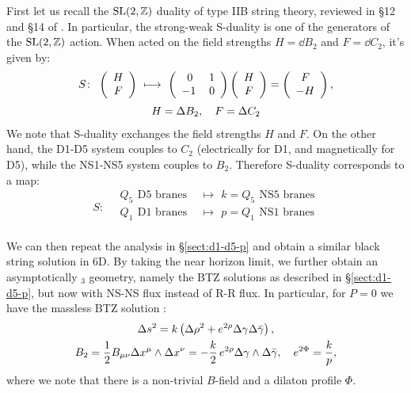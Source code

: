 \documentclass[11pt,a4paper]{article}
\newcommand{\ads}[1]{\text{AdS}\ensuremath{_{#1}}}
\begin{document}
	First let us recall the $\mathrm{SL}(2,\mathbb{Z})$ duality of type IIB string theory, reviewed in \S12 and \S14 of \cite{Polchinski:1998rr}. In particular, the strong-weak S-duality is one of the generators of the $\mathrm{SL}(2,\mathbb{Z})$ action. When acted on the field strengths $H = \dd{B_2}$ and $F = \dd{C_2}$, it's given by:
	\begin{gather}
		S\colon\ %
		\pqty{\begin{array}{c} H \\ F \end{array}}
		\ \longmapsto\ %
		\pqty{\begin{array}{cc}
			0 & 1 \\
			-1\hspace*{.2em} & 0
		\end{array}}
		\pqty{\begin{array}{c} H \\ F \end{array}}
		= \pqty{\begin{array}{c} F \\ -H \end{array}},
	\\[.5ex]
		H = \dd{B_2},\quad F = \dd{C_2} \nonumber
	\end{gather}
	We note that S-duality exchanges the field strengths $H$ and $F$. On the other hand, the D1-D5 system couples to $C_2$ (electrically for D1, and magnetically for D5), while the NS1-NS5 system couples to $B_2$. Therefore S-duality corresponds to a map:
	\begin{equation}
	S\colon\quad
	\begin{aligned}
		Q_5\ \,\text{D5 branes}
		\ \,&\longmapsto\ \,
		k = Q_5\ \,\text{NS5 branes} \\
		Q_1\ \,\text{D1 branes}
		\ \,&\longmapsto\ \,
		p = Q_1\ \,\text{NS1 branes} \\
	\end{aligned}
	\end{equation}
	
	We can then repeat the analysis in \S\ref{sect:d1-d5-p} and obtain a similar black string solution in 6D. By taking the near horizon limit, we further obtain an asymptotically \ads{3} geometry, namely the BTZ solutions as described in \S\ref{sect:d1-d5-p}, but now with NS-NS flux instead of R-R flux. In particular, for $P = 0$ we have the massless BTZ solution \needcites:
	\begin{gather}
		\Delta{s}^2
		= k \left(
			\Delta{\rho}^2
			+ e^{2\rho} \Delta{\gamma} \Delta{\bar{\gamma}}
		\right),
	\\
		B_2 = \frac{1}{2} B_{\mu\nu}
				\Delta{x^\mu} \wedge \Delta{x^\nu}
		= - \frac{k}{2}\,e^{2\rho}
				\Delta{\gamma} \wedge \Delta{\bar{\gamma}},
	\quad e^{2\Phi} = \frac{k}{p},
	\end{gather}
	where we note that there is a non-trivial $B$-field and a dilaton profile $\Phi$. 
	
\end{document}

